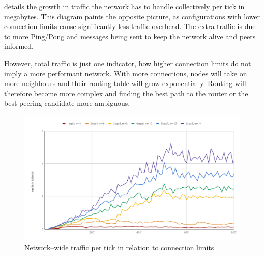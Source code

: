  details the growth in traffic the network has to handle collectively per tick in megabytes. This diagram paints the opposite picture, as configurations with lower connection limits cause significantly less traffic overhead. The extra traffic is due to more Ping/Pong and \peerUpdate messages being sent to keep the network alive and peers informed.

However, total traffic is just one indicator, how higher connection limits do not imply a more performant network. With more connections, nodes will take on more neighbours and their routing table will grow exponentially. Routing will therefore become more complex and finding the best path to the router or the best peering candidate more ambiguous.

\begin{figure}[htb!]
\centering
\includegraphics[width=1.0\textwidth]{graphics/analysis/connection-limit-total-io.pdf}
\caption{Network–wide traffic per tick in relation to connection limits}
\label{fig:connection-limits-total-io}
\end{figure}
